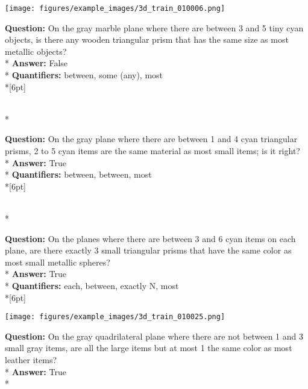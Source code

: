 \begin{figure*}
  \begin{minipage}{0.48\textwidth}
    \texttt{[image: figures/example\_images/3d\_train\_010006.png]}
    \begin{minipage}[t][2.2cm][t]{1\textwidth}
      \footnotesize
      \textbf{Question:} On the gray marble plane where there are between 3 and 5 tiny cyan objects, is there any wooden triangular prism that has the same size as most metallic objects? \\*
      \textbf{Answer:}  False \\*
      \textbf{Quantifiers:} between, some (any), most \\*[6pt]
    \end{minipage}\\*
    \begin{minipage}[t][2.2cm][t]{1\textwidth}
      \footnotesize
      \textbf{Question:} On the gray plane where there are between 1 and 4 cyan triangular prisms, 2 to 5 cyan items are the same material as most small items; is it right? \\*
      \textbf{Answer:} True \\*
      \textbf{Quantifiers:} between, between, most \\*[6pt]
    \end{minipage}\\*
    \begin{minipage}[t][2.2cm][t]{1\textwidth}
      \footnotesize
      \textbf{Question:} On the planes where there are between 3 and 6 cyan items on each plane, are there exactly 3 small triangular prisms that have the same color as most small metallic spheres? \\*
      \textbf{Answer:} True \\*
      \textbf{Quantifiers:} each, between, exactly N, most  \\*[6pt]
    \end{minipage}
  \end{minipage}
  \hspace{3.5mm}
  \begin{minipage}{0.48\textwidth}
    \texttt{[image: figures/example\_images/3d\_train\_010025.png]}
    \begin{minipage}[t][2.2cm][t]{1\textwidth}
      \footnotesize
      \textbf{Question:} On the gray quadrilateral plane where there are not between 1 and 3 small gray items, are all the large items but at most 1 the same color as most leather items? \\*
      \textbf{Answer:} True \\*

\end{minipage}
\end{minipage}
\end{figure*}
